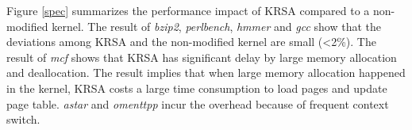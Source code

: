 \documentclass[conference]{IEEEtran}
\begin{document}

Figure \ref{spec} summarizes the performance impact of KRSA compared to a non-modified kernel. 
The result of \textit{bzip2}, \textit{perlbench}, \textit{hmmer} and \textit{gcc} show that the deviations among KRSA and the non-modified kernel are small (\textless2\%).
The result of \textit{mcf} shows that KRSA has significant delay by large memory allocation and deallocation. The result implies that when large memory allocation happened in the kernel, KRSA costs a large time consumption to load pages and update page table. 
\textit{astar} and \textit{omenttpp} incur the overhead because of frequent context switch.

%
\end{document}

